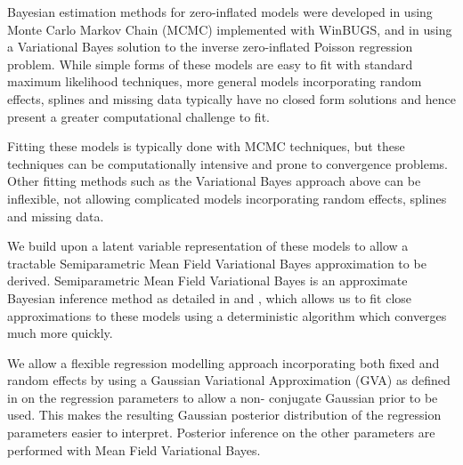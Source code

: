 Bayesian estimation methods for zero-inflated models were developed in
\cite{Ghosh2006} using Monte Carlo Markov Chain (MCMC) implemented with WinBUGS, and in \cite{Vatsa2014}
using a Variational Bayes solution to the inverse zero-inflated Poisson
regression problem. While simple forms of these models are easy to fit with
standard maximum likelihood techniques, more general models incorporating
random effects, splines and missing data typically have no closed form
solutions and hence present a greater computational challenge to fit.

Fitting these models is typically done with MCMC
techniques, but these techniques can be computationally intensive and prone to
convergence problems. Other fitting methods such as the Variational Bayes
approach above can be inflexible, not allowing complicated models incorporating
random effects, splines and missing data.

We build upon a latent variable representation of these models to allow a
tractable Semiparametric Mean Field Variational Bayes approximation to be
derived. Semiparametric Mean Field Variational Bayes is an approximate Bayesian
inference method as detailed in \cite{Ormerod2010} and \cite{Rohde2015}, which
allows us to fit close approximations to these models using a deterministic
algorithm which converges much more quickly.

We allow a flexible regression modelling approach incorporating both fixed and
random effects by using a Gaussian Variational Approximation (GVA) as defined in
\cite{Ormerod2012} on the regression parameters to allow a non- conjugate
Gaussian prior to be used. This makes the resulting Gaussian posterior
distribution of the regression parameters easier to interpret. Posterior
inference on the other parameters are performed with Mean Field Variational
Bayes.

